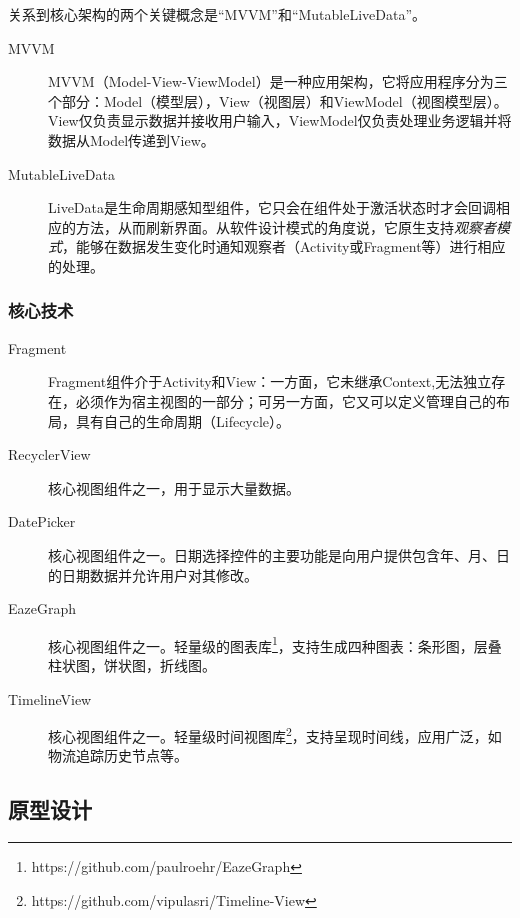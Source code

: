\documentclass[12pt, a4paper, UTF8]{ctexart}
\begin{document}
关系到核心架构的两个关键概念是“MVVM”和“MutableLiveData”。
\begin{description}
    \item[MVVM]
        MVVM（Model-View-ViewModel）是一种应用架构，它将应用程序分为三个部分：Model（模型层），View（视图层）和ViewModel（视图模型层）。View仅负责显示数据并接收用户输入，ViewModel仅负责处理业务逻辑并将数据从Model传递到View。

    \item[MutableLiveData]
        LiveData是生命周期感知型组件，它只会在组件处于激活状态时才会回调相应的方法，从而刷新界面。从软件设计模式的角度说，它原生支持\emph{观察者模式}，能够在数据发生变化时通知观察者（Activity或Fragment等）进行相应的处理。
\end{description}

\subsubsection{核心技术}
\begin{description}
    \item[Fragment]
        Fragment组件介于Activity和View：一方面，它未继承Context,无法独立存在，必须作为宿主视图的一部分；可另一方面，它又可以定义管理自己的布局，具有自己的生命周期（Lifecycle）。
    \item[RecyclerView] 核心视图组件之一，用于显示大量数据。
    \item[DatePicker] 核心视图组件之一。日期选择控件的主要功能是向用户提供包含年、月、日的日期数据并允许用户对其修改。
    \item[EazeGraph]
        核心视图组件之一。轻量级的图表库\footnote{https://github.com/paulroehr/EazeGraph}，支持生成四种图表：条形图，层叠柱状图，饼状图，折线图。
    \item[TimelineView]
        核心视图组件之一。轻量级时间视图库\footnote{https://github.com/vipulasri/Timeline-View}，支持呈现时间线，应用广泛，如物流追踪历史节点等。

\end{description}

\subsection{原型设计}
\end{document}
